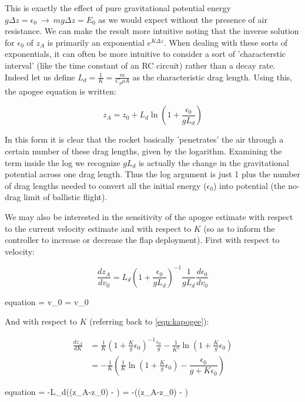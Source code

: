 \documentclass{article}
\begin{document}
	This is exactly the effect of pure gravitational potential energy $g\Delta z = \epsilon_0\ \rightarrow\ mg\Delta z = E_0$ as we would expect without the presence of air resistance.  We can make the result more intuitive noting that the inverse solution for $\epsilon_0$ of $z_A$ is primarily an exponential $e^{K\Delta z}$.  When dealing with these sorts of exponentials, it can often be more intuitive to consider a sort of 'characterstic interval' (like the time constant of an RC circuit) rather than a decay rate.  Indeed let us define $L_d = \frac{1}{K} = \frac{m}{C_p\rho A}$ as the characteristic drag length.  Using this, the apogee equation is written:
	
	\begin{equation} \label{eqn:apogee}
	z_A = z_0 + L_d\ln\left(1 + \frac{\epsilon_0}{gL_d}\right)
	\end{equation}
	
	In this form it is clear that the rocket basically 'penetrates' the air through a certain number of these drag lengths, given by the logarithm.  Examining the term inside the log we recognize $gL_d$ is actually the change in the gravitational potential across one drag length.  Thus the log argument is just 1 plus the number of drag lengths needed to convert all the initial energy ($\epsilon_0$) into potential (the no-drag limit of ballistic flight).
	
	We may also be interested in the sensitivity of the apogee estimate with respect to the current velocity estimate and with respect to $K$ (so as to inform the controller to increase or decrease the flap deployment).  First with respect to velocity:
	
	\begin{equation}
		\frac{dz_A}{dv_0} = L_d\left(1+\frac{\epsilon_0}{gL_d}\right)^{-1}\frac{1}{gL_d}\frac{d\epsilon_0}{dv_0}
	\end{equation}
	\begin{empheq}[box=\fbox]{equation}
		 = v_0 = v_0
	\end{empheq}
	
	And with respect to $K$ (referring back to \eqref{eqn:kapogee}):
	
	\begin{align}
	\frac{dz_A}{dK} &= \frac{1}{K}\left(1+\frac{K}{g}\epsilon_0\right)^{-1}\frac{\epsilon_0}{g} - \frac{1}{K^2}\ln\left(1 + \frac{K}{g}\epsilon_0\right) \\
	&= -\frac{1}{K}\left(\frac{1}{K}\ln\left(1 + \frac{K}{g}\epsilon_0\right) - \dfrac{\epsilon_0}{g+K\epsilon_0}\right)
	\end{align}
	\begin{empheq}[box=\fbox]{equation} \label{eqn:kderiv}
	 = -L_d\left(\left(z_A-z_0\right) - \right) = -\left(\left(z_A-z_0\right) - \right)
	\end{empheq}
	
\end{document}
